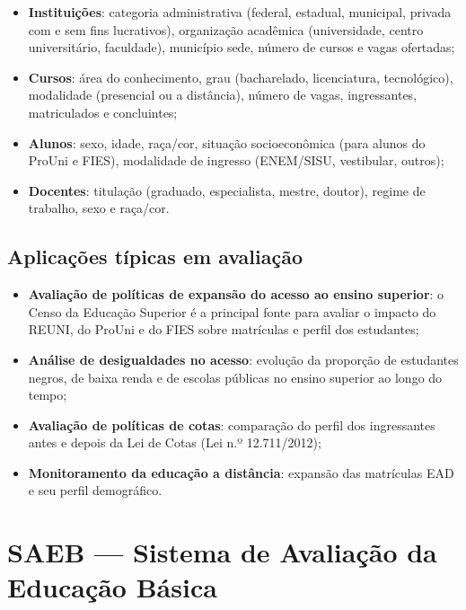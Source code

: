 \begin{itemize}
  \item \textbf{Instituições}: categoria administrativa (federal, estadual, municipal, privada com e sem fins lucrativos), organização acadêmica (universidade, centro universitário, faculdade), município sede, número de cursos e vagas ofertadas;
  \item \textbf{Cursos}: área do conhecimento, grau (bacharelado, licenciatura, tecnológico), modalidade (presencial ou a distância), número de vagas, ingressantes, matriculados e concluintes;
  \item \textbf{Alunos}: sexo, idade, raça/cor, situação socioeconômica (para alunos do ProUni e FIES), modalidade de ingresso (ENEM/SISU, vestibular, outros);
  \item \textbf{Docentes}: titulação (graduado, especialista, mestre, doutor), regime de trabalho, sexo e raça/cor.
\end{itemize}

\subsection{Aplicações típicas em avaliação}

\begin{itemize}
  \item \textbf{Avaliação de políticas de expansão do acesso ao ensino superior}: o Censo da Educação Superior é a principal fonte para avaliar o impacto do REUNI, do ProUni e do FIES sobre matrículas e perfil dos estudantes;
  \item \textbf{Análise de desigualdades no acesso}: evolução da proporção de estudantes negros, de baixa renda e de escolas públicas no ensino superior ao longo do tempo;
  \item \textbf{Avaliação de políticas de cotas}: comparação do perfil dos ingressantes antes e depois da Lei de Cotas (Lei n.º 12.711/2012);
  \item \textbf{Monitoramento da educação a distância}: expansão das matrículas EAD e seu perfil demográfico.
\end{itemize}

\section{SAEB — Sistema de Avaliação da Educação Básica}

